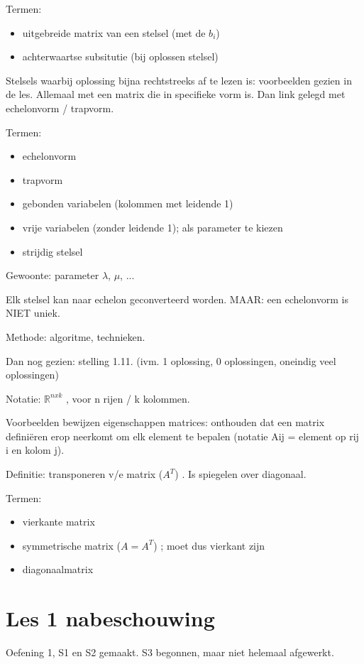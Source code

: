 \documentclass{article}
\begin{document}
Termen: 
\begin{itemize}
\item uitgebreide matrix van een stelsel (met de $b_i$) 
\item achterwaartse subsitutie (bij oplossen stelsel) 
\end{itemize}

Stelsels waarbij oplossing bijna rechtstreeks af te lezen is:  voorbeelden gezien in de les. Allemaal met een matrix die in specifieke vorm is. Dan link gelegd met echelonvorm / trapvorm. 

Termen:
\begin{itemize}
\item echelonvorm
\item trapvorm
\item gebonden variabelen (kolommen met leidende 1) 
\item vrije variabelen (zonder leidende 1); als parameter te kiezen
\item strijdig stelsel
\end{itemize}

Gewoonte: parameter $\lambda$, $\mu$, ...

Elk stelsel kan naar echelon geconverteerd worden. MAAR: een echelonvorm is NIET uniek. 

Methode: algoritme, technieken. 

Dan nog gezien: stelling 1.11. (ivm. 1 oplossing, 0 oplossingen, oneindig veel oplossingen)

Notatie: $\mathbb{R}^{nxk}$ , voor n rijen / k kolommen. 

Voorbeelden bewijzen eigenschappen matrices: onthouden dat een matrix defini{\"e}ren erop neerkomt om elk element te bepalen (notatie Aij = element op rij i en kolom j). 

Definitie: transponeren v/e matrix ($A^T$) . Is spiegelen over diagonaal. 

Termen:
\begin{itemize}
\item vierkante matrix
\item symmetrische matrix ($A = A^T$) ; moet dus vierkant zijn
\item diagonaalmatrix
\end{itemize}

\section{Les 1 nabeschouwing}

Oefening 1, S1 en S2 gemaakt. S3 begonnen, maar niet helemaal afgewerkt.
\end{document}
